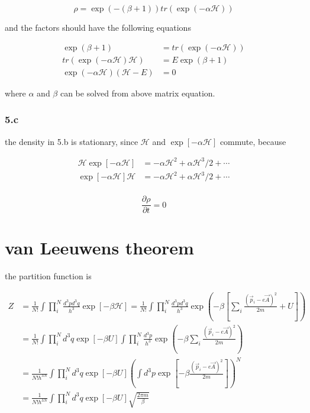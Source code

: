 \documentclass{article}
\begin{document}
$$
\rho = \exp(-(\beta + 1)) tr(\exp(-\alpha\mathcal{H}))
$$

and the factors should have the following equations

$$
\begin{aligned}
    \exp(\beta + 1) &= tr(\exp(-\alpha\mathcal{H}) )\\
    tr(\exp(-\alpha\mathcal{H})\mathcal{H}) &= E \exp(\beta + 1)\\
    \exp(-\alpha\mathcal{H}) (\mathcal{H} -E) &= 0
\end{aligned}
$$

where $\alpha$ and $\beta$ can be solved from above matrix equation.

\subsubsection*{5.c}

the density in 5.b is stationary, since $\mathcal{H}$ and $\exp[-\alpha\mathcal{H}]$ commute, because

$$
\begin{aligned}
    \mathcal{H} \exp[-\alpha\mathcal{H}] &= -\alpha\mathcal{H}^2 + \alpha\mathcal{H}^3/2 + \cdots\\
    \exp[-\alpha\mathcal{H}]\mathcal{H} &= -\alpha\mathcal{H}^2 + \alpha\mathcal{H}^3/2 + \cdots\\
\end{aligned}
$$

$$
\frac{\partial \rho}{\partial t} = 0
$$

\section*{van Leeuwens theorem}
the partition function is

$$
\begin{aligned}
    Z &= \frac{1}{N!}\int \prod_{i}^{N} \frac{d^3p d^3q}{h^3} \exp[-\beta \mathcal{H}] = \frac{1}{N!}\int \prod_{i}^{N} \frac{d^3p d^3q}{h^3}\exp(-\beta [\sum_i \frac{(\vec{p}_i - e\vec{A})^2}{2m}+ U])\\
    &= \frac{1}{N!}\int \prod_{i}^{N} d^3q \exp[-\beta U] \int \prod_{i}^{N} \frac{d^3p}{h^3} \exp(-\beta \sum_i \frac{(\vec{p}_i - e\vec{A})^2}{2m})\\
    &= \frac{1}{N! h^{3N}}\int \prod_{i}^{N} d^3q \exp[-\beta U] (\int d^3p \exp[-\beta \frac{(\vec{p}_i - e\vec{A})^2}{2m}])^N\\
    &= \frac{1}{N! h^{3N}}\int \prod_{i}^{N} d^3q \exp[-\beta U] \sqrt{\frac{2\pi m}{\beta}}
\end{aligned}
$$
\end{document}
